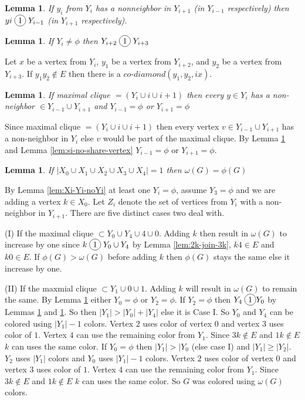 \documentclass[12pt]{article}
\newcommand*\circled[1]{\tikz[baseline=(char.base)]{
            \node[shape=circle,draw,inner sep=2pt] (char) {#1};}}
\newtheorem{Lemma}[Theorem]{Lemma}
\begin{document}
{\begin{Lemma}\label{lem:yi-miss-two-neighbors}
If $y_i$ from $Y_i$ has a nonneighbor in $Y_{i+1}$ (in $Y_{i-1}$ respectively) then $yi \;\circled{1}\; Y_{i-1}$ (in $Y_{i+1}$ respectively).
\end{Lemma}

\begin{Lemma}\label{lem:yi-force-join}
If $Y_i \neq \phi$ then $Y_{i+2} \;\circled{1}\; Y_{i+3}$
\end{Lemma}
 Let $x$ be a vertex from $Y_i$, $y_1$ be a vertex from $Y_{i+2}$, and $y_2$ be a vertex from $Y_{i+3}$. If $y_1y_2\not\in E$ then there is a $co$-$diamond (y_1, y_2, ix)$. 

\begin{Lemma}\label{lem:max-clique-yi}
If maximal clique $ = (Y_i \cup i \cup i+1)$ then every $y \in Y_i$ has a non-neighbor $\in Y_{i-1} \cup Y_{i+1}$ and $Y_{i-1} = \phi$ or $Y_{i+1} = \phi$
\end{Lemma}
 Since maximal clique $ = (Y_i \cup i \cup i+1)$ then every vertex $v \in Y_{i-1} \cup Y_{i+1}$ has a non-neighbor in $Y_i$ else $v$ would be part of the maximal clique. By Lemma \ref{lem:yi-miss-two-neighbors} and Lemma \ref{lem:si-no-share-vertex} $Y_{i-1} = \phi$ or $Y_{i+1} = \phi$.

\begin{Lemma}\label{lem:add-2vertex}
If $|X_0 \cup X_1 \cup X_2 \cup X_3 \cup X_4| = 1$ then $\omega(G) =  \phi(G)$
\end{Lemma}
 By Lemma \ref{lem:Xi-Yi-noYi} at least one $Y_i = \phi$, assume $Y_3 = \phi$ and we are adding a vertex $k \in X_0$. Let $Z_i$ denote the set of vertices from $Y_i$ with a non-neighbor in $Y_{i+1}$. There are five distinct cases two deal with.

(I) If the maximal clique $\subset Y_0 \cup Y_4 \cup 4 \cup 0$. Adding $k$ then result in $\omega(G)$ to increase by one since $k \;\circled{1}\; Y_0 \cup Y_4$ by Lemma \ref{lem:2k-join-3k}, $k4 \in E$ and $k0 \in E$. If $\phi(G) > \omega(G)$ before adding $k$ then $\phi(G)$ stays the same else it increase by one.

(II) If the maxmial clique $\subset Y_1 \cup 0 \cup 1$. Adding $k$ will result in $\omega(G)$ to remain the same. By Lemma \ref{lem:max-clique-yi} either $Y_0 = \phi$ or $Y_2 = \phi$. If $Y_2 = \phi$ then $Y_4 \;\circled{1} Y_0$ by Lemmas \ref{lem:max-clique-yi} and \ref{lem:yi-miss-two-neighbors}. So then $|Y_1| > |Y_0| + |Y_4|$ else it is Case I. So $Y_0$ and $Y_4$ can be colored using $|Y_1| - 1$ colors. Vertex $2$ uses color of vertex $0$ and vertex $3$ uses color of $1$. Vertex $4$ can use the remaining color from $Y_1$. Since $3k \not \in E$ and $1k \not \in E$ $k$ can uses the same color. If $Y_0 = \phi$ then $|Y_1| > |Y_0$ (else case I) and $|Y_1| \geq |Y_2|$. $Y_2$ uses $|Y_1|$ colors and $Y_0$ uses $|Y_1| - 1$ colors. Vertex $2$ uses color of vertex $0$ and vertex $3$ uses color of $1$. Vertex $4$ can use the remaining color from $Y_1$. Since $3k \not \in E$ and $1k \not \in E$ $k$ can uses the same color. So $G$ was colored using $\omega(G)$ colors.

}
\end{document}
